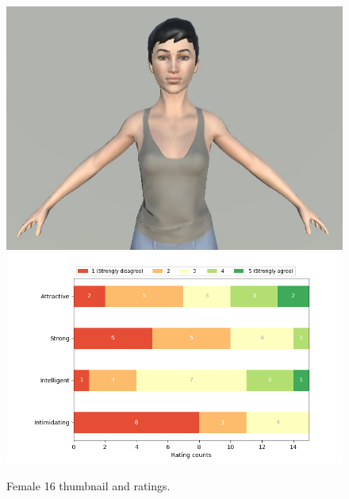 \begin{figure}[H]
  \includegraphics[width=\linewidth]{Images/Females/16.JPG}
\endminipage\hfill
{}
  \includegraphics[width=\linewidth]{Survey/FRatings/avatar_f16.png}
\endminipage\hfill
\caption{Female 16 thumbnail and ratings.}
\end{figure}

